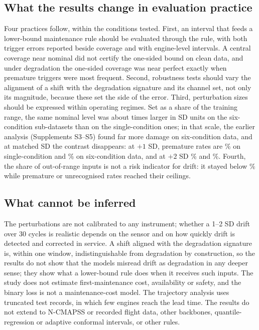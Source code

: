 \documentclass[11pt,a4paper]{article}
\begin{document}
\subsection{What the results change in evaluation practice}
Four practices follow, within the conditions tested. First, an interval that feeds a lower-bound maintenance rule should be evaluated through the rule, with both trigger errors reported beside coverage and with engine-level intervals. A central coverage near nominal did not certify the one-sided bound on clean data, and under degradation the one-sided coverage was near perfect exactly when premature triggers were most frequent. Second, robustness tests should vary the alignment of a shift with the degradation signature and its channel set, not only its magnitude, because these set the side of the error. Third, perturbation sizes should be expressed within operating regimes. Set as a share of the training range, the same nominal level was about \RVRatioFactor{} times larger in SD units on the six-condition sub-datasets than on the single-condition ones; in that scale, the earlier analysis (Supplements S3--S5) found far more damage on six-condition data, and at matched SD the contrast disappears: at $+1$ SD, premature rates are \RVPremOneSingle\% on single-condition and \RVPremOneSix\% on six-condition data, and at $+2$ SD \RVPremTwoSingle\% and \RVPremTwoSix\%. Fourth, the share of out-of-range inputs is not a risk indicator for drift: it stayed below \RVFoobTwo\% while premature or unrecognised rates reached their ceilings.

\subsection{What cannot be inferred}
The perturbations are not calibrated to any instrument; whether a 1--2 SD drift over 30 cycles is realistic depends on the sensor and on how quickly drift is detected and corrected in service. A shift aligned with the degradation signature is, within one window, indistinguishable from degradation by construction, so the results do not show that the models misread drift as degradation in any deeper sense; they show what a lower-bound rule does when it receives such inputs. The study does not estimate first-maintenance cost, availability or safety, and the binary loss is not a maintenance-cost model. The trajectory analysis uses truncated test records, in which few engines reach the lead time. The results do not extend to N-CMAPSS or recorded flight data, other backbones, quantile-regression or adaptive conformal intervals, or other rules.
\end{document}
